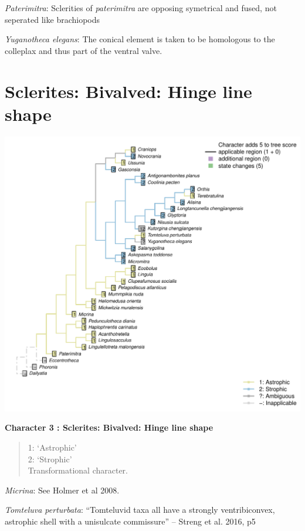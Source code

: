 \documentclass[]{book}
\theoremstyle{definition}
\theoremstyle{definition}
\theoremstyle{definition}
\theoremstyle{remark}
\begin{document}
\emph{Paterimitra}: Sclerities of \emph{paterimitra} are opposing
symetrical and fused, not seperated like brachiopods

\emph{Yuganotheca elegans}: The conical element is taken to be
homologous to the colleplax and thus part of the ventral valve.

\hypertarget{sclerites-bivalved-hinge-line-shape}{%
\section*{Sclerites: Bivalved: Hinge line
shape}\label{sclerites-bivalved-hinge-line-shape}}

\includegraphics{Brachiopod_phylogeny_files/figure-latex/unnamed-chunk-5-3.pdf}

\textbf{Character 3 : Sclerites: Bivalved: Hinge line shape }

\begin{quote}
1: `Astrophic'\\
2: `Strophic'\\
Transformational character.
\end{quote}

\emph{Micrina}: See Holmer et al 2008.

\emph{Tomteluva perturbata}: ``Tomteluvid taxa all have a strongly
ventribiconvex, astrophic shell with a unisulcate commissure'' -- Streng
et al. 2016, p5
\end{document}
